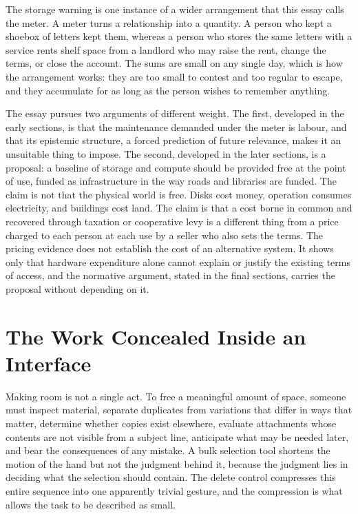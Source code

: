 \documentclass[12pt]{article}
\begin{document}
The storage warning is one instance of a wider arrangement that this essay calls the meter. A meter turns a relationship into a quantity. A person who kept a shoebox of letters kept them, whereas a person who stores the same letters with a service rents shelf space from a landlord who may raise the rent, change the terms, or close the account. The sums are small on any single day, which is how the arrangement works: they are too small to contest and too regular to escape, and they accumulate for as long as the person wishes to remember anything.

The essay pursues two arguments of different weight. The first, developed in the early sections, is that the maintenance demanded under the meter is labour, and that its epistemic structure, a forced prediction of future relevance, makes it an unsuitable thing to impose. The second, developed in the later sections, is a proposal: a baseline of storage and compute should be provided free at the point of use, funded as infrastructure in the way roads and libraries are funded. The claim is not that the physical world is free. Disks cost money, operation consumes electricity, and buildings cost land. The claim is that a cost borne in common and recovered through taxation or cooperative levy is a different thing from a price charged to each person at each use by a seller who also sets the terms. The pricing evidence does not establish the cost of an alternative system. It shows only that hardware expenditure alone cannot explain or justify the existing terms of access, and the normative argument, stated in the final sections, carries the proposal without depending on it.

\section{The Work Concealed Inside an Interface}\label{sec:work}

Making room is not a single act. To free a meaningful amount of space, someone must inspect material, separate duplicates from variations that differ in ways that matter, determine whether copies exist elsewhere, evaluate attachments whose contents are not visible from a subject line, anticipate what may be needed later, and bear the consequences of any mistake. A bulk selection tool shortens the motion of the hand but not the judgment behind it, because the judgment lies in deciding what the selection should contain. The delete control compresses this entire sequence into one apparently trivial gesture, and the compression is what allows the task to be described as small.
\end{document}
